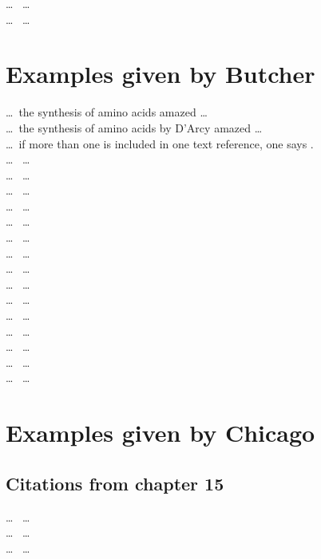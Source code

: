 \dots\ \cite{pym-24} \dots\\
%
\dots\ \cite{croft-78} \dots\\
 
\chapter{Examples given by Butcher}
 
\dots\ the synthesis of amino acids \cite[pp.\ 131--8]{darcy-20-amaz}
amazed \dots\\
%
\dots\ the synthesis of amino acids by D'Arcy
 amazed \dots\\
%
\dots\ if more than one is included in one text reference,
one says .\\
%
\dots\ \cite{jones-n-h-r} \dots\\
%
\dots\ \cite{jones-s-r} \dots\\
%
\dots\ \cite{jones-65} \dots\\
%
\dots\ \cite{jones-69} \dots\\
%
\dots\ \cite{jones-abrams} \dots\\
%
\dots\ \cite{jones-a-s} \dots\\
%
\dots\ \cite{jones-smith} \dots\\
%
\dots\ \cite{bloggs-60} \dots\\
%
\dots\ \cite{bloggs-61} \dots\\
%
\dots\ \cite{bloggs-jones} \dots\\
%
\dots\ \cite{bloggs-s-j} \dots\\
%
\dots\ \cite{brown-f-s} \dots\\
%
\dots\ \cite{eckstein-zuckerman} \dots\\
%
\dots\ \cite{heller-lederis} \dots\\
%
\dots\ \cite{wood-61} \dots\\
 
\chapter{Examples given by Chicago}
 
\section{Citations from chapter 15}
 
\dots\ \cite[121--25]{pratt-75} \dots\\
%
\dots\ \cite{light-72,light-wong,kingston-76} \dots\\
%
\dots\ \cite{kelley-96-spring,kelley-96-autumn,kelley-07} \dots\\
 
